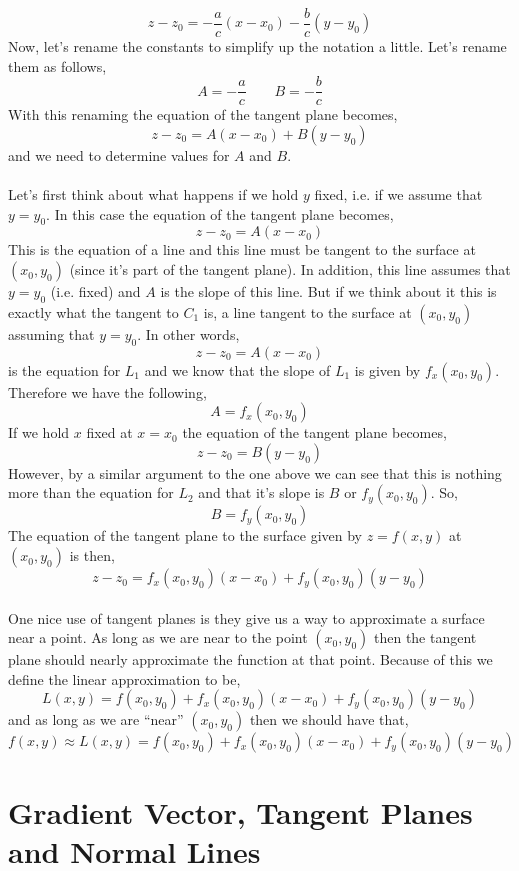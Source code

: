 \documentclass[10pt,reqno]{book}
\theoremstyle{definition}
\begin{document}
	\[ z - z_0 = -\frac{a}{c}(x-x_0) - \frac{b}{c}(y-y_0) \]
	Now, let's rename the constants to simplify up the notation a little. Let's rename them as follows,
	\[ A = -\frac{a}{c} \qquad B = -\frac{b}{c} \]
	With this renaming the equation of the tangent plane becomes,
	\[ z - z_0 = A(x-x_0) + B(y-y_0) \]
	and we need to determine values for $ A $ and $ B $.  \\ \\
	Let's first think about what happens if we hold $ y $ fixed, i.e. if we assume that $ y = y_0 $. In this case the equation of the tangent plane becomes,
	\[ z - z_0 = A(x-x_0) \]
	This is the equation of a line and this line must be tangent to the surface at $ (x_0,y_0) $ (since it's part of the tangent plane). In addition, this line assumes that $ y = y_0 $ (i.e. fixed) and $ A $ is the slope of this line. But if we think about it this is exactly what the tangent to $ C_1 $ is, a line tangent to the surface at $ (x_0,y_0) $ assuming that $ y = y_0 $. In other words, 
	\[ z - z_0 = A(x-x_0) \]
	is the equation for $ L_1 $ and we know that the slope of $ L_1 $ is given by $ f_x(x_0,y_0) $. Therefore we have the following,
	\[ A = f_x(x_0,y_0) \]
	If we hold $ x $ fixed at $ x = x_0 $ the equation of the tangent plane becomes,
	\[ z - z_0 = B(y-y_0) \]
	However, by a similar argument to the one above we can see that this is nothing more than the equation for $ L_2 $ and that it's slope is $ B $ or $ f_y(x_0,y_0) $. So,
	\[ B = f_y(x_0,y_0) \]
	The equation of the tangent plane to the surface given by $ z = f(x,y) $ at $ (x_0,y_0) $ is then,
	\[ z - z_0 = f_x(x_0,y_0)(x-x_0) + f_y(x_0,y_0)(y-y_0) \]\\
	One nice use of tangent planes is they give us a way to approximate a surface near a point. As long as we are near to the point $ (x_0,y_0) $ then the tangent plane should nearly approximate the function at that point. Because of this we define the linear approximation to be,
	\[ L(x,y) = f(x_0,y_0) + f_x(x_0,y_0)(x-x_0) + f_y(x_0,y_0)(y-y_0) \]
	and as long as we are ``near'' $ (x_0,y_0) $ then we should have that,
	\[ f(x,y) \approx L(x,y) = f(x_0,y_0) + f_x(x_0,y_0)(x-x_0) + f_y(x_0,y_0)(y-y_0) \]
	
	\section{Gradient Vector, Tangent Planes and Normal Lines}
	
\end{document}

